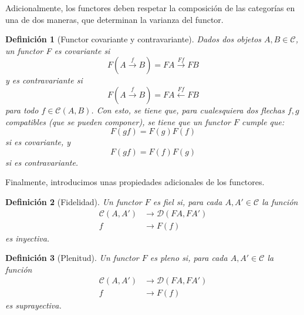 \documentclass[12pt,letterpaper,titlepage]{article}
\newtheorem*{defn}{Definición}
\theoremstyle{definition}
\newcommand\<{\langle}
\renewcommand\>{\rangle}
\begin{document}
Adicionalmente, los functores deben respetar la composición de las categorías en una de dos maneras, que determinan la varianza del functor.
\begin{defn}[Functor covariante y contravariante]
    Dados dos objetos $A,B\in\mathcal{C}$, un functor F es covariante si
    \begin{equation*}
        F(A\overset{f}{\to}B)=FA\overset{Ff}{\to}FB
    \end{equation*}
    y es contravariante si
    \begin{equation*}
        F(A\overset{f}{\to}B)=FA\overset{Ff}{\leftarrow}FB
    \end{equation*}
    para todo $f\in\mathcal{C}(A,B)$.
    Con esto, se tiene que, para cualesquiera dos flechas $f,g$ compatibles (que se pueden componer), se tiene que un functor $F$ cumple que:
    \begin{equation*}
        F(gf)=F(g)F(f)
    \end{equation*}
    si es covariante, y 
    \begin{equation*}
        F(gf)=F(f)F(g)
    \end{equation*}
    si es contravariante.
\end{defn}
Finalmente, introducimos unas propiedades adicionales de los functores.
\begin{defn}[Fidelidad]
    Un functor $F$ es fiel si, para cada $A,A'\in\mathcal{C}$ la función 
    \begin{align*}
        \mathcal{C}(A,A') & \to \mathcal{D}(FA,FA')\\
        f & \to F(f)
    \end{align*}
    es inyectiva.
\end{defn}
\begin{defn}[Plenitud]
    Un functor $F$ es pleno si, para cada $A,A'\in\mathcal{C}$ la función 
    \begin{align*}
        \mathcal{C}(A,A') & \to \mathcal{D}(FA,FA')\\
        f & \to F(f)
    \end{align*}
    es suprayectiva.
\end{defn}
\end{document}
